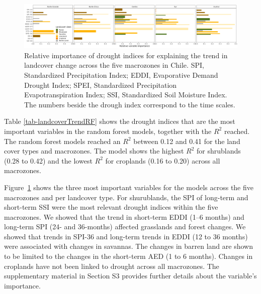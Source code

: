 \documentclass[
  authoryear,
  preprint,
  3p,
  onecolumn]{elsarticle}
\begin{document}
\begin{figure}[!ht]

{\centering \includegraphics[width=1\textwidth,height=\textheight]{../output/figs/bars_relative_importance_RF.png}

}

\caption{\label{fig-varImportance}Relative importance of drought indices
for explaining the trend in landcover change across the five macrozones
in Chile. SPI, Standardized Precipitation Index; EDDI, Evaporative
Demand Drought Index; SPEI, Standardized Precipitation
Evapotranspiration Index; SSI, Standardized Soil Moisture Index. The
numbers beside the drough index correspond to the time scales.}

\end{figure}

Table \ref{tab-landcoverTrendRF} shows the drought indices that are the
most important variables in the random forest models, together with the
\(R^2\) reached. The random forest models reached an \(R^2\) between
0.12 and 0.41 for the land cover types and macrozones. The model shows
the highest \(R^2\) for shrublands (0.28 to 0.42) and the lowest \(R^2\)
for croplands (0.16 to 0.20) across all macrozones.

Figure~\ref{fig-varImportance} shows the three most important variables
for the models across the five macrozones and per landcover type. For
shurublands, the SPI of long-term and short-term SSI were the most
relevant drought indices within the five macrozones. We showed that the
trend in short-term EDDI (1--6 months) and long-term SPI (24- and
36-months) affected grasslands and forest changes. We showed that trends
in SPI-36 and long-term trends in EDDI (12 to 36 months) were associated
with changes in savannas. The changes in barren land are shown to be
limited to the changes in the short-term AED (1 to 6 months). Changes in
croplands have not been linked to drought across all macrozones. The
supplementary material in Section S3 provides further details about the
variable's importance.
\end{document}
